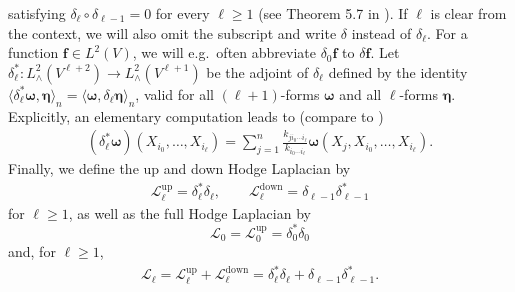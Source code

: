 \documentclass[10pt]{article}
\DeclareMathOperator{\up}{up}
\DeclareMathOperator{\down}{down}
\theoremstyle{plain}
\theoremstyle{definition}
\theoremstyle{remark}
\begin{document}
satisfying $\delta_\ell\circ \delta_{\ell-1}=0$ for every $\ell\geq 1$ (see Theorem 5.7 in \cite{Lim20}). If $\ell$ is clear from the context, we will also omit the subscript and write $\delta$ instead of $\delta_\ell$. For a function $\mathbf{f}\in L^2(V)$, we will e.g.~often abbreviate $\delta_0 \mathbf{f}$ to $\delta \mathbf{f}$. Let $\delta_{\ell}^*:L^2_{\wedge}(V^{\ell+2})\rightarrow L^2_{\wedge}(V^{\ell+1})$ be the adjoint of $\delta_{\ell}$ defined by the identity $\langle \delta_{\ell}^*\boldsymbol{\omega},\boldsymbol{\eta}\rangle_n=\langle \boldsymbol{\omega},\delta_{\ell}\boldsymbol{\eta}\rangle_n$, valid for all $(\ell+1)$-forms $\boldsymbol{\omega}$ and all $\ell$-forms $\boldsymbol{\eta}$. Explicitly, an elementary computation leads to (compare to \cite{Smale12})
\begin{align}\label{eq:adjoint:delta}
    (\delta_{\ell}^*\boldsymbol{\omega})(X_{i_0},\dots,X_{i_\ell})=\sum_{j=1}^n \frac{k_{ji_0\cdots i_\ell}}{k_{i_0\cdots i_\ell}}\boldsymbol{\omega}(X_{j},X_{i_0},\dots, X_{i_\ell}).
\end{align}
Finally, we define the up and down Hodge Laplacian by 
    \begin{align*}
         \mathscr{L}_\ell^{\up}=\delta_{\ell}^*\delta_{\ell},\qquad \mathscr{L}_\ell^{\down}=\delta_{\ell-1}\delta_{\ell-1}^* 
    \end{align*}
    for $ \ell\geq 1$, as well as the full Hodge Laplacian by $$\mathscr{L}_0=\mathscr{L}_0^{\up}=\delta_0^*\delta_0$$ and, for $\ell\geq 1$,
    \begin{align*}
    \mathscr{L}_\ell=\mathscr{L}_\ell^{\up}+\mathscr{L}_\ell^{\down}=\delta_{\ell}^*\delta_{\ell}+\delta_{\ell-1}\delta_{\ell-1}^*.
    \end{align*}
\end{document}
